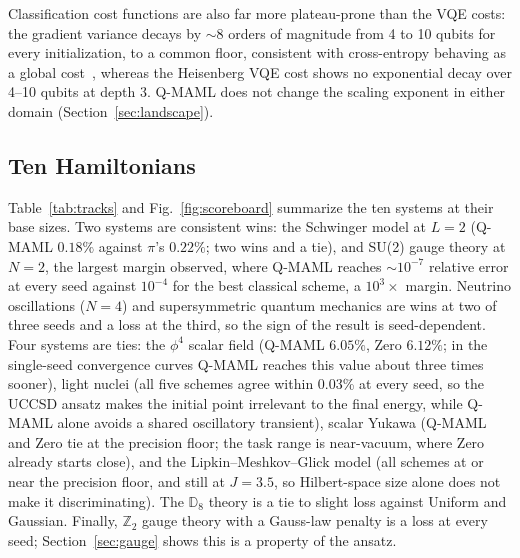 \documentclass[pdflatex,sn-mathphys-num]{sn-jnl}
\begin{document}
Classification cost functions are also far more plateau-prone than the VQE costs: the gradient variance decays by $\sim$8 orders of magnitude from 4 to 10 qubits for every initialization, to a common floor, consistent with cross-entropy behaving as a global cost~\cite{cerezo2021costfunction}, whereas the Heisenberg VQE cost shows no exponential decay over 4--10 qubits at depth 3. Q-MAML does not change the scaling exponent in either domain (Section~\ref{sec:landscape}).

\subsection{Ten Hamiltonians}\label{sec:ten}

Table~\ref{tab:tracks} and Fig.~\ref{fig:scoreboard} summarize the ten systems at their base sizes. Two systems are consistent wins: the Schwinger model at $L{=}2$ (Q-MAML $0.18\%$ against $\pi$'s $0.22\%$; two wins and a tie), and SU(2) gauge theory at $N{=}2$, the largest margin observed, where Q-MAML reaches $\sim10^{-7}$ relative error at every seed against $10^{-4}$ for the best classical scheme, a $10^{3}\times$ margin. Neutrino oscillations ($N{=}4$) and supersymmetric quantum mechanics are wins at two of three seeds and a loss at the third, so the sign of the result is seed-dependent. Four systems are ties: the $\phi^4$ scalar field (Q-MAML $6.05\%$, Zero $6.12\%$; in the single-seed convergence curves Q-MAML reaches this value about three times sooner), light nuclei (all five schemes agree within 0.03\% at every seed, so the UCCSD ansatz makes the initial point irrelevant to the final energy, while Q-MAML alone avoids a shared oscillatory transient), scalar Yukawa (Q-MAML and Zero tie at the precision floor; the task range is near-vacuum, where Zero already starts close), and the Lipkin--Meshkov--Glick model (all schemes at or near the precision floor, and still at $J{=}3.5$, so Hilbert-space size alone does not make it discriminating). The $\mathbb{D}_8$ theory is a tie to slight loss against Uniform and Gaussian. Finally, $\mathbb{Z}_2$ gauge theory with a Gauss-law penalty is a loss at every seed; Section~\ref{sec:gauge} shows this is a property of the ansatz.
\end{document}
